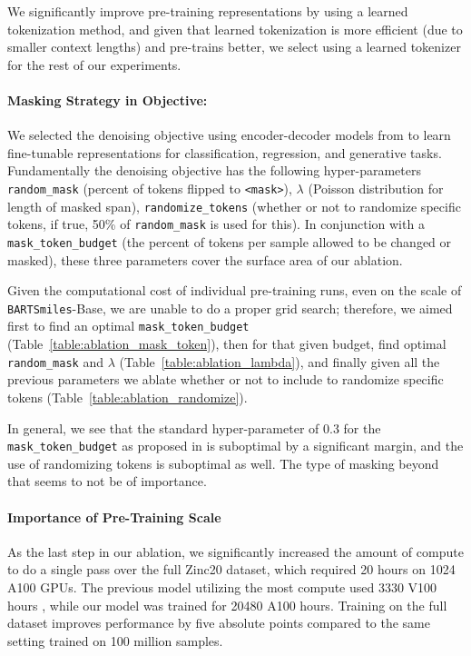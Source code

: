 \documentclass{article} %
\newcommand{\MODEL}{\texttt{BARTSmiles}}
\begin{document}
We significantly improve pre-training representations by using a learned tokenization method, and given that learned tokenization is more efficient (due to smaller context lengths) and pre-trains better, we select using a learned tokenizer for the rest of our experiments.

\paragraph{Masking Strategy in Objective:}
We selected the denoising objective using encoder-decoder models from \citep{BART} to learn fine-tunable representations for classification, regression, and generative tasks. Fundamentally the denoising objective has the following hyper-parameters \texttt{random\_mask} (percent of tokens flipped to \texttt{<mask>}), $\lambda$ (Poisson distribution for length of masked span), \texttt{randomize\_tokens} (whether or not to randomize specific tokens, if true, 50\% of \texttt{random\_mask} is used for this). In conjunction with a \texttt{mask\_token\_budget} (the percent of tokens per sample allowed to be changed or masked), these three parameters cover the surface area of our ablation.

Given the computational cost of individual pre-training runs, even on the scale of \MODEL{}-Base, we are unable to do a proper grid search; therefore, we aimed first to find an optimal \texttt{mask\_token\_budget} (Table~\ref{table:ablation_mask_token}), then for that given budget, find optimal \texttt{random\_mask} and $\lambda$ (Table~\ref{table:ablation_lambda}), and finally given all the previous parameters we ablate whether or not to include to randomize specific tokens (Table~\ref{table:ablation_randomize}).



In general, we see that the standard hyper-parameter of 0.3 for the \texttt{mask\_token\_budget} as proposed in \citet{BART} is suboptimal by a significant margin, and the use of randomizing tokens is suboptimal as well. The type of masking beyond that seems to not be of importance.
\paragraph{Importance of Pre-Training Scale}
As the last step in our ablation, we significantly increased the amount of compute to do a single pass over the full Zinc20 dataset, which required 20 hours on 1024 A100 GPUs. The previous model utilizing the most compute used 3330 V100 hours \cite{MolFormer}, while our model was trained for 20480 A100 hours. Training on the full dataset improves performance by five absolute points compared to the same setting trained on 100 million samples.
\end{document}
